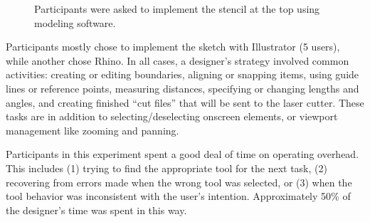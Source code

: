 \documentclass{article}
\begin{document}
\begin{figure}[h]
\centering 
{}

\caption{Participants were asked to implement the stencil at the top
  using modeling software.}
\label{fig:interview-sketch}
\end{figure}

Participants mostly chose to implement the sketch with Illustrator (5
users), while another chose Rhino. In all cases, a designer's strategy
involved common activities: creating or editing boundaries, aligning
or snapping items, using guide lines or reference points, measuring
distances, specifying or changing lengths and angles, and creating
finished ``cut files'' that will be sent to the laser cutter. These
tasks are in addition to selecting/deselecting onscreen elements, or
viewport management like zooming and panning.

Participants in this experiment spent a good deal of time on operating
overhead. This includes (1) trying to find the appropriate tool for
the next task, (2) recovering from errors made when the wrong tool was
selected, or (3) when the tool behavior was inconsistent with the
user's intention. Approximately 50\% of the designer's time was spent
in this way.
\end{document}
